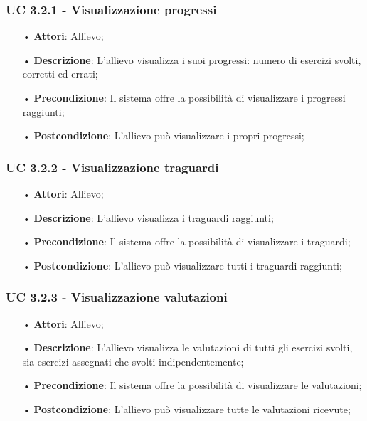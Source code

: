 \subsubsection{UC 3.2.1 - Visualizzazione progressi}
\begin{itemize}
\item[•]\textbf{Attori}: Allievo;
\item[•]\textbf{Descrizione}: L’allievo visualizza i suoi progressi: numero di esercizi svolti, corretti ed errati;
\item[•]\textbf{Precondizione}: Il sistema offre la possibilità di visualizzare i progressi raggiunti;
\item[•]\textbf{Postcondizione}: L’allievo può visualizzare i propri progressi;
\end{itemize}

\subsubsection{UC 3.2.2 - Visualizzazione traguardi}
\begin{itemize}
\item[•]\textbf{Attori}: Allievo;
\item[•]\textbf{Descrizione}: L’allievo visualizza i traguardi raggiunti;
\item[•]\textbf{Precondizione}: Il sistema offre la possibilità di visualizzare i traguardi;
\item[•]\textbf{Postcondizione}: L’allievo può visualizzare tutti i traguardi raggiunti;
\end{itemize}

\subsubsection{UC 3.2.3 - Visualizzazione valutazioni}
\begin{itemize}
\item[•]\textbf{Attori}: Allievo;
\item[•]\textbf{Descrizione}: L’allievo visualizza le valutazioni di tutti gli esercizi svolti, sia esercizi assegnati che svolti indipendentemente;
\item[•]\textbf{Precondizione}: Il sistema offre la possibilità di visualizzare le valutazioni;
\item[•]\textbf{Postcondizione}: L’allievo può visualizzare tutte le valutazioni ricevute;
\end{itemize}

